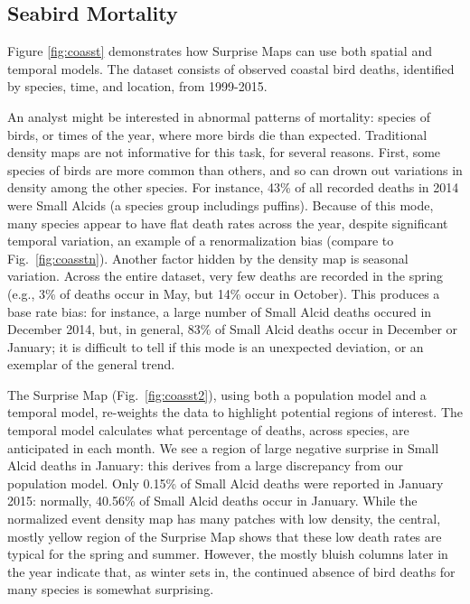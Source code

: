 \documentclass[journal]{vgtc}                %
\begin{document}
\subsection{Seabird Mortality}
\coasstFig

Figure \ref{fig:coasst} demonstrates how Surprise Maps can use both spatial and temporal models. The dataset consists of observed coastal bird deaths, identified by species, time, and location, from 1999-2015.

An analyst might be interested in abnormal patterns of mortality: species of birds, or times of the year, where more birds die than expected. Traditional density maps are not informative for this task, for several reasons. First, some species of birds are more common than others, and so can drown out variations in density among the other species. For instance, 43\% of all recorded deaths in 2014 were Small Alcids (a species group includings puffins). Because of this mode, many species appear to have flat death rates across the year, despite significant temporal variation, an example of a renormalization bias (compare to Fig.~\ref{fig:coasstn}). Another factor hidden by the density map is seasonal variation. Across the entire dataset, very few deaths are recorded in the spring (e.g., 3\% of deaths occur in May, but 14\% occur in October). This produces a base rate bias: for instance, a large number of Small Alcid deaths occured in December 2014, but, in general, 83\% of Small Alcid deaths occur in December or January; it is difficult to tell if this mode is an unexpected deviation, or an exemplar of the general trend.

The Surprise Map (Fig.~\ref{fig:coasst2}), using both a population model and a temporal model, re-weights the data to highlight potential regions of interest. The temporal model calculates what percentage of deaths, across species, are anticipated in each month. We see a region of large negative surprise in Small Alcid deaths in January: this derives from a large discrepancy from our population model. Only 0.15\% of Small Alcid deaths were reported in January 2015: normally, 40.56\% of Small Alcid deaths occur in January. While the normalized event density map has many patches with low density, the central, mostly yellow region of the Surprise Map shows that these low death rates are typical for the spring and summer. However, the mostly bluish columns later in the year indicate that, as winter sets in, the continued absence of bird deaths for many species is somewhat surprising.
\end{document}
